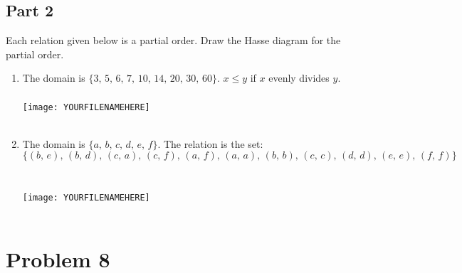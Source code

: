 \documentclass{amsart}
\theoremstyle{definition}
\theoremstyle{Exercise}
\theoremstyle{remark}
\theoremstyle{rule}
\numberwithin{equation}{section}
\begin{document}
\subsection*{Part 2}
Each relation given below is a partial order. Draw the Hasse diagram for the partial order.

\begin{enumerate}[label=(\alph*)]
\item The domain is $\{3,\, 5,\, 6,\, 7,\, 10,\, 14,\, 20,\, 30,\, 60\}$. $x \leq y$ if $x$ evenly divides $y$.\\\\

\texttt{[image: YOURFILENAMEHERE]}
\\\\

\item The domain is $\{a,\, b,\, c,\, d,\, e,\, f\}$. The relation is the set:
\[
\{ (b,\, e),\, (b,\, d),\, (c,\, a),\, (c,\, f),\, (a,\, f),\, (a,\, a),\, (b,\, b),\, (c, \,c),\, (d,\, d),\, (e, \,e), \,(f,\, f) \}
\]\\\\

\texttt{[image: YOURFILENAMEHERE]}
\\\\

\end{enumerate}

\newpage%

\section*{Problem 8}
\end{document}
